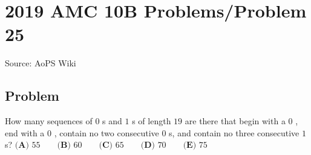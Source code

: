 \documentclass[12pt]{article}
\begin{document}
\section*{{2019 AMC 10B Problems/Problem 25}}
Source: AoPS Wiki

\subsection*{Problem}
How many sequences of $0$ s and $1$ s of length $19$ are there that begin with a $0$ , end with a $0$ , contain no two consecutive $0$ s, and contain no three consecutive $1$ s? $\textbf{(A) }55\qquad\textbf{(B) }60\qquad\textbf{(C) }65\qquad\textbf{(D) }70\qquad\textbf{(E) }75$
\end{document}
